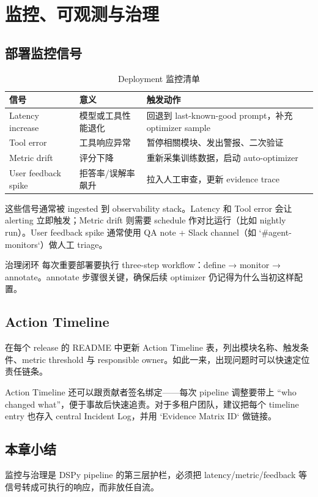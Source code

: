 \section{监控、可观测与治理}

\subsection{部署监控信号}

\begin{table}[H]
\centering
\caption{Deployment 监控清单}
\begin{tabular}{p{}p{}p{}}
\toprule
信号 & 意义 & 触发动作 \\
\midrule
Latency increase & 模型或工具性能退化 & 回退到 last-known-good prompt，补充 optimizer sample \\
Tool error & 工具响应异常 & 暂停相關模块、发出警报、二次验证 \\
Metric drift & 评分下降 & 重新采集训练数据，启动 auto-optimizer \\
User feedback spike & 拒答率/误解率飙升 & 拉入人工审查，更新 evidence trace \\
\bottomrule
\end{tabular}
\end{table}

这些信号通常被 ingested 到 observability stack。Latency 和 Tool error 会让 alerting 立即触发；Metric drift 则需要 schedule 作对比运行（比如 nightly run）。User feedback spike 通常使用 QA note + Slack channel（如 `\#agent-monitors`）做人工 triage。

\begin{warningbox}{治理闭环}
每次重要部署要执行 three-step workflow：define → monitor → annotate。annotate 步骤很关键，确保后续 optimizer 仍记得为什么当初这样配置。
\end{warningbox}

\subsection{Action Timeline}

在每个 release 的 README 中更新 Action Timeline 表，列出模块名称、触发条件、metric threshold 与 responsible owner。如此一来，出现问题时可以快速定位责任链条。

Action Timeline 还可以跟贡献者签名绑定——每次 pipeline 调整要带上 ``who changed what''，便于事故后快速追责。对于多租户团队，建议把每个 timeline entry 也存入 central Incident Log，并用 `Evidence Matrix ID` 做链接。

\subsection{本章小结}

监控与治理是 DSPy pipeline 的第三层护栏，必须把 latency/metric/feedback 等信号转成可执行的响应，而非放任自流。

